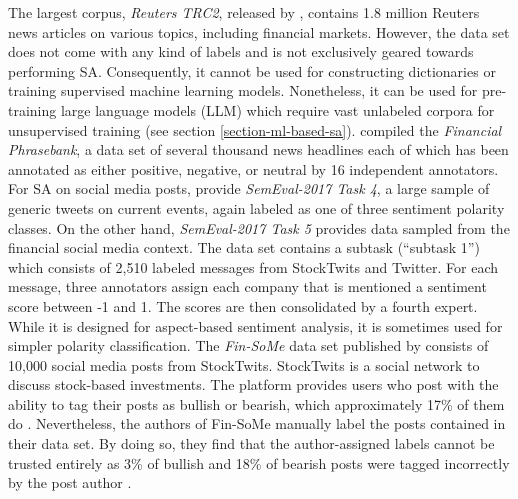 The largest corpus, \emph{Reuters TRC2}, released by , contains 1.8 million Reuters news articles on various topics, including financial markets. However, the data set does not come with any kind of labels and is not exclusively geared towards performing SA. Consequently, it cannot be used for constructing dictionaries or training supervised machine learning models. Nonetheless, it can be used for pre-training large language models (LLM) which require vast unlabeled corpora for unsupervised training (see section \ref{section-ml-based-sa}).  compiled the \emph{Financial Phrasebank}, a data set of several thousand news headlines each of which has been annotated as either positive, negative, or neutral by 16 independent annotators. For SA on social media posts,  provide \emph{SemEval-2017 Task 4}, a large sample of generic tweets on current events, again labeled as one of three sentiment polarity classes. On the other hand, \emph{SemEval-2017 Task 5}  provides data sampled from the financial social media context. The data set contains a subtask (``subtask 1'') which consists of 2,510 labeled messages from StockTwits and Twitter. For each message, three annotators assign each company that is mentioned a sentiment score between -1 and 1. The scores are then consolidated by a fourth expert. While it is designed for aspect-based sentiment analysis, it is sometimes used for simpler polarity classification. The \emph{Fin-SoMe} data set published by  consists of 10,000 social media posts from StockTwits. StockTwits is a social network to discuss stock-based investments. The platform provides users who post with the ability to tag their posts as bullish or bearish, which approximately 17\% of them do . Nevertheless, the authors of Fin-SoMe manually label the posts contained in their data set. By doing so, they find that the author-assigned labels cannot be trusted entirely as 3\% of bullish and 18\% of bearish posts were tagged incorrectly by the post author .


